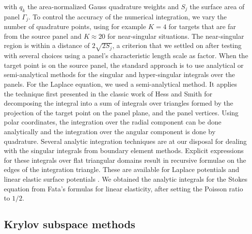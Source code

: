 \documentclass[smallcondensed,final]{svjour3}
\begin{document}
\noindent
with $q_k$ the area-normalized Gauss quadrature weights and $S_j$ the surface area of panel $\Gamma_j$. To control the accuracy of the numerical integration, we vary the number of quadrature points, using for example $K= 4$ for targets that are far from the source panel and $K\approx 20$ for near-singular situations. 
The near-singular region is within a distance of $2\sqrt{2 S_j}$, a criterion that we settled on after  testing with several choices using a panel's characteristic length scale as factor.
When the target point is on the source panel, the standard approach is to use analytical or semi-analytical methods for the singular and hyper-singular integrals over the panels.
For the Laplace equation, we used a semi-analytical method. 
It applies the technique first presented in the classic work of Hess and Smith \cite[p.~49, ff.]{HessSmith1967} for decomposing the integral into a sum of integrals over triangles formed by the projection of the target point on the panel plane, and the panel vertices. Using polar coordinates, the integration over the radial component can be done analytically and the integration over the angular component is done by quadrature. %
Several analytic integration techniques are at our disposal for dealing with the singular integrals from boundary element methods. Explicit expressions for these integrals over flat triangular domains result in recursive formulae on the edges of the integration triangle. These are available for Laplace potentials \cite{Fata2009} and linear elastic surface potentials \cite{Fata2011}. 
We obtained the analytic integrals for the Stokes equation from Fata's formulas for linear elasticity, after setting the Poisson ratio to $1/2$. 

\subsection{Krylov subspace methods}
\end{document}
